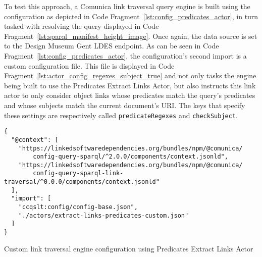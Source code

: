 To test this approach, a Comunica link traversal query engine is built using the configuration as depicted in Code Fragment~\ref{lst:config_predicates_actor}, in turn tasked with resolving the query displayed in Code Fragment~\ref{lst:sparql_manifest_height_image}. Once again, the data source is set to the Design Museum Gent LDES endpoint. As can be seen in Code Fragment~\ref{lst:config_predicates_actor}, the configuration's second import is a custom configuration file. This file is displayed in Code Fragment~\ref{lst:actor_config_regexes_subject_true} and not only tasks the engine being built to use the Predicates Extract Links Actor, but also instructs this link actor to only consider object links whose predicates match the query's predicates and whose subjects match the current document's URI. The keys that specify these settings are respectively called \texttt{predicateRegexes} and \texttt{checkSubject}.

\begin{listing}[htbp]
    \begin{verbatim}
{
  "@context": [
    "https://linkedsoftwaredependencies.org/bundles/npm/@comunica/
        config-query-sparql/^2.0.0/components/context.jsonld",
    "https://linkedsoftwaredependencies.org/bundles/npm/@comunica/
        config-query-sparql-link-traversal/^0.0.0/components/context.jsonld"
  ],
  "import": [
    "ccqslt:config/config-base.json",
    "./actors/extract-links-predicates-custom.json"
  ]
}
    \end{verbatim}
    \caption{Custom link traversal engine configuration using Predicates Extract Links Actor}
    \label{lst:config_predicates_actor}
\end{listing}

